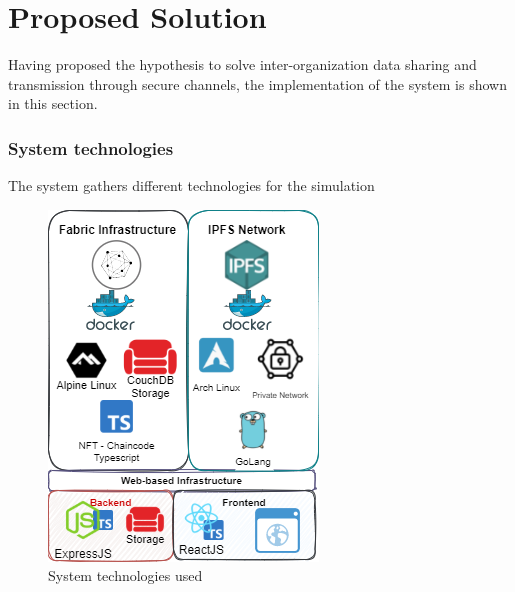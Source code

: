 \section{Proposed Solution}
Having proposed the hypothesis to solve inter-organization data sharing and transmission through secure channels, the implementation of the system is shown in this section.

\subsubsection{System technologies}
The system gathers different technologies for the simulation 

\begin{figure}[!h]
    \centering
    \includegraphics[scale=0.5]{img/System-Technologies.png}
    \caption{System technologies used}
    \label{fig:SystemTechUSed}
\end{figure}

